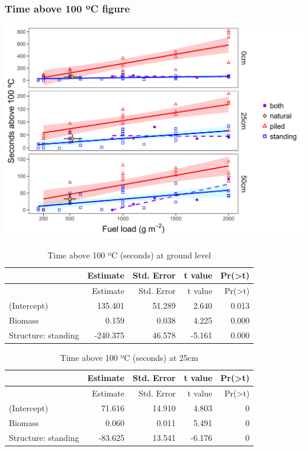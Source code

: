\documentclass[11pt,a4paper]{article}
\begin{document}
\hypertarget{time-above-100-c-figure}{%
\subsubsection{Time above 100 ºC figure}\label{time-above-100-c-figure}}

\includegraphics{figures/compare_secsAbv100-1.png}

\begin{longtable}[]{@{}lrrrr@{}}
\caption{Time above 100 ºC (seconds) at ground level}\tabularnewline
\toprule
& Estimate & Std. Error & t value &
Pr(\textgreater{}\textbar{}t\textbar{})\tabularnewline
\midrule
\endfirsthead
\toprule
& Estimate & Std. Error & t value &
Pr(\textgreater{}\textbar{}t\textbar{})\tabularnewline
\midrule
\endhead
(Intercept) & 135.401 & 51.289 & 2.640 & 0.013\tabularnewline
Biomass & 0.159 & 0.038 & 4.225 & 0.000\tabularnewline
Structure: standing & -240.375 & 46.578 & -5.161 & 0.000\tabularnewline
\bottomrule
\end{longtable}

\begin{longtable}[]{@{}lrrrr@{}}
\caption{Time above 100 ºC (seconds) at 25cm}\tabularnewline
\toprule
& Estimate & Std. Error & t value &
Pr(\textgreater{}\textbar{}t\textbar{})\tabularnewline
\midrule
\endfirsthead
\toprule
& Estimate & Std. Error & t value &
Pr(\textgreater{}\textbar{}t\textbar{})\tabularnewline
\midrule
\endhead
(Intercept) & 71.616 & 14.910 & 4.803 & 0\tabularnewline
Biomass & 0.060 & 0.011 & 5.491 & 0\tabularnewline
Structure: standing & -83.625 & 13.541 & -6.176 & 0\tabularnewline
\bottomrule
\end{longtable}
\end{document}

